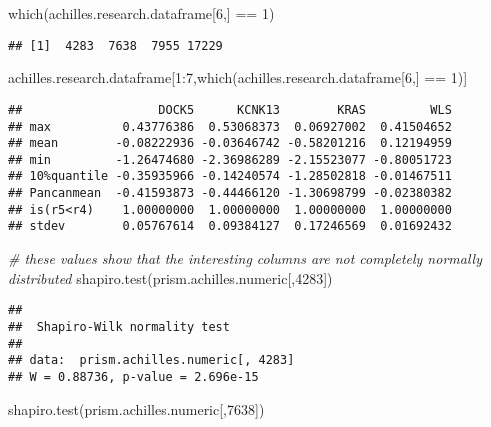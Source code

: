\documentclass[
]{article}
\newenvironment{Shaded}{\begin{snugshade}}{\end{snugshade}}
\newcommand{\CommentTok}[1]{\textcolor[rgb]{0.56,0.35,0.01}{\textit{#1}}}
\newcommand{\DecValTok}[1]{\textcolor[rgb]{0.00,0.00,0.81}{#1}}
\newcommand{\FunctionTok}[1]{\textcolor[rgb]{0.00,0.00,0.00}{#1}}
\newcommand{\NormalTok}[1]{#1}
\newcommand{\SpecialCharTok}[1]{\textcolor[rgb]{0.00,0.00,0.00}{#1}}
\begin{document}
\begin{Shaded}
\begin{Highlighting}[]
\FunctionTok{which}\NormalTok{(achilles.research.dataframe[}\DecValTok{6}\NormalTok{,] }\SpecialCharTok{==} \DecValTok{1}\NormalTok{)}
\end{Highlighting}
\end{Shaded}

\begin{verbatim}
## [1]  4283  7638  7955 17229
\end{verbatim}

\begin{Shaded}
\begin{Highlighting}[]
\NormalTok{achilles.research.dataframe[}\DecValTok{1}\SpecialCharTok{:}\DecValTok{7}\NormalTok{,}\FunctionTok{which}\NormalTok{(achilles.research.dataframe[}\DecValTok{6}\NormalTok{,] }\SpecialCharTok{==} \DecValTok{1}\NormalTok{)]}
\end{Highlighting}
\end{Shaded}

\begin{verbatim}
##                   DOCK5      KCNK13        KRAS         WLS
## max          0.43776386  0.53068373  0.06927002  0.41504652
## mean        -0.08222936 -0.03646742 -0.58201216  0.12194959
## min         -1.26474680 -2.36986289 -2.15523077 -0.80051723
## 10%quantile -0.35935966 -0.14240574 -1.28502818 -0.01467511
## Pancanmean  -0.41593873 -0.44466120 -1.30698799 -0.02380382
## is(r5<r4)    1.00000000  1.00000000  1.00000000  1.00000000
## stdev        0.05767614  0.09384127  0.17246569  0.01692432
\end{verbatim}

\begin{Shaded}
\begin{Highlighting}[]
\CommentTok{\# these values show that the interesting columns are not completely normally distributed}
\FunctionTok{shapiro.test}\NormalTok{(prism.achilles.numeric[,}\DecValTok{4283}\NormalTok{])}
\end{Highlighting}
\end{Shaded}

\begin{verbatim}
## 
##  Shapiro-Wilk normality test
## 
## data:  prism.achilles.numeric[, 4283]
## W = 0.88736, p-value = 2.696e-15
\end{verbatim}

\begin{Shaded}
\begin{Highlighting}[]
\FunctionTok{shapiro.test}\NormalTok{(prism.achilles.numeric[,}\DecValTok{7638}\NormalTok{])}
\end{Highlighting}
\end{Shaded}
\end{document}
